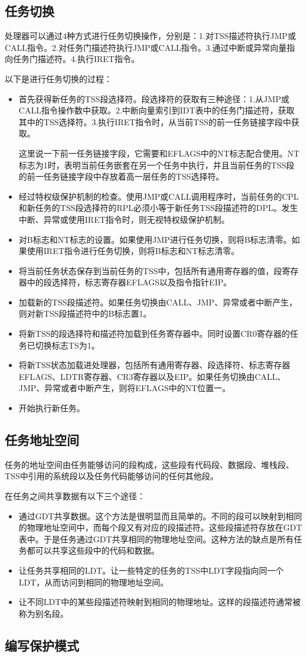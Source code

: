\documentclass[a4paper,left=2.5cm,right=2.5cm,11pt]{article}
\begin{document}
\subsection{任务切换}
	处理器可以通过4种方式进行任务切换操作，分别是：1.对TSS描述符执行JMP或CALL指令。2.对任务门描述符执行JMP或CALL指令。3.通过中断或异常向量指向任务门描述符。4.执行IRET指令。\par
	以下是进行任务切换的过程：
	\begin{itemize}
		\item 首先获得新任务的TSS段选择符。段选择符的获取有三种途径：1.从JMP或CALL指令操作数中获取。2.中断向量索引到IDT表中的任务门描述符，获取其中的TSS选择符。3.执行IRET指令时，从当前TSS的前一任务链接字段中获取。\par
		这里说一下前一任务链接字段，它需要和EFLAGS中的NT标志配合使用。NT标志为1时，表明当前任务嵌套在另一个任务中执行，并且当前任务的TSS段的前一任务链接字段中存放着高一层任务的TSS选择符。
		\item 经过特权级保护机制的检查。使用JMP或CALL调用程序时，当前任务的CPL和新任务的TSS段选择符的RPL必须小等于新任务TSS段描述符的DPL。发生中断、异常或使用IRET指令时，则无视特权级保护机制。
		\item 对B标志和NT标志的设置。如果使用JMP进行任务切换，则将B标志清零。如果使用IRET指令进行任务切换，则将B标志和NT标志清零。
		\item 将当前任务状态保存到当前任务的TSS中，包括所有通用寄存器的值，段寄存器中的段选择符，标志寄存器EFLAGS以及指令指针EIP。
		\item 加载新的TSS段描述符。如果任务切换由CALL、JMP、异常或者中断产生，则对新TSS段描述符中的B标志置1。
		\item 将新TSS的段选择符和描述符加载到任务寄存器中。同时设置CR0寄存器的任务已切换标志TS为1。
		\item 将新TSS状态加载进处理器，包括所有通用寄存器、段选择符、标志寄存器EFLAGS、LDTR寄存器、CR3寄存器以及EIP。如果任务切换由CALL、JMP、异常或者中断产生，则将EFLAGS中的NT位置一。
		\item 开始执行新任务。
	\end{itemize}
\subsection{任务地址空间}
	任务的地址空间由任务能够访问的段构成，这些段有代码段、数据段、堆栈段、TSS中引用的系统段以及任务代码能够访问的任何其他段。\par
	在任务之间共享数据有以下三个途径：
	\begin{itemize}
		\item 通过GDT共享数据。这个方法是很明显而且简单的。不同的段可以映射到相同的物理地址空间中，而每个段又有对应的段描述符。这些段描述符存放在GDT表中。于是任务通过GDT共享相同的物理地址空间。这种方法的缺点是所有任务都可以共享这些段中的代码和数据。
		\item 让任务共享相同的LDT。让一些特定的任务的TSS中LDT字段指向同一个LDT，从而访问到相同的物理地址空间。
		\item 让不同LDT中的某些段描述符映射到相同的物理地址。这样的段描述符通常被称为别名段。
	\end{itemize}
\subsection{编写保护模式}
\end{document}
